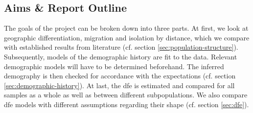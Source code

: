 \documentclass[hidelinks,11pt]{article}
\begin{document}
    \subsection{Aims \& Report Outline}
    \label{sec:objectives}

    The goals of the project can be broken down into three parts. At first, we look at geographic differentiation, migration and isolation by distance, which we compare with established results from literature (cf. section \ref{sec:population-structure}). Subsequently, models of the demographic history are fit to the data. Relevant demographic models will have to be determined beforehand. The inferred demography is then checked for accordance with the expectations (cf. section \ref{sec:demographic-history}). At last, the \acrfull{dfe} is estimated and compared for all samples as a whole as well as between different subpopulations. We also compare \acrshort{dfe} models with different assumptions regarding their shape (cf. section \ref{sec:dfe}).
\end{document}
